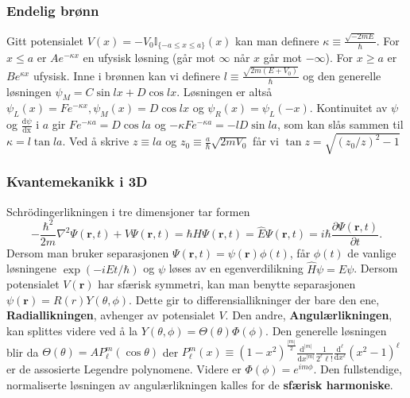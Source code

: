 \documentclass[a4paper, norsk, 8pt]{article}
\newcommand{\PAR}[2]{ \frac{\partial #1}{\partial #2}}
\begin{document}
\begin{multicols*}{3}
\subsubsection*{\scriptsize Endelig brønn}
Gitt potensialet $V(x)=-V_0\mathbb{I}_{\{-a\leq x \leq a\} }(x)$ kan man definere $\kappa\equiv\frac{\sqrt{-2mE}}{\hbar}$. For $x\leq a$ er $Ae^{-\kappa x}$ en ufysisk løsning (går mot $\infty$ når $x$ går mot $-\infty$). For $x\geq a$ er $Be^{\kappa x}$ ufysisk. Inne i brønnen kan vi definere $l\equiv \frac{\sqrt{2m(E+V_0)}}{\hbar}$ og den generelle løsningen $\psi_M = C\sin{lx}+D\cos{lx}$. Løsningen er altså $\psi_L(x) = Fe^{-\kappa x}, \psi_M(x) = D\cos{lx}$ og $\psi_R(x) = \psi_L(-x)$. Kontinuitet av $\psi$ og $\frac{\mbox{d}\psi}{\mbox{dx}}$ i $a$ gir $Fe^{-\kappa a}=D\cos{la}$ og $-\kappa Fe^{-\kappa a}=-lD\sin{la}$, som kan slås sammen til $\kappa=l\tan{la}$. Ved å skrive $z\equiv la$ og $z_0\equiv \frac{a}{\hbar}\sqrt{2mV_0}$ får vi $\tan z = \sqrt{(z_0/z)^2-1}$

\subsubsection*{\scriptsize Kvantemekanikk i 3D}
Schrödingerlikningen i tre dimensjoner tar formen \[-\frac{\hbar^2}{2m}\nabla^2\Psi(\mathbf{r},t)+V\Psi(\mathbf{r},t)=\hbar{H}\Psi(\mathbf{r},t)=\hat{E}\Psi(\mathbf{r},t)=i\hbar \PAR{\Psi(\mathbf{r},t)}{t}.\]
Dersom man bruker separasjonen $\Psi(\mathbf{r},t)=\psi(\mathbf{r})\phi(t)$, får $\phi(t)$ de vanlige løsningene $\exp{(-iEt/\hbar)}$ og $\psi$ løses av en egenverdilikning $\hat{H}\psi=E\psi$. Dersom potensialet $V(\mathbf{r})$ har sfærisk symmetri, kan man benytte separasjonen $\psi(\mathbf{r})=R(r)Y(\theta,\phi)$. Dette gir to differensiallikninger der bare den ene, \textbf{Radiallikningen}, avhenger av potensialet $V$. Den andre, \textbf{Angulærlikningen}, kan splittes videre ved å la $Y(\theta,\phi)=\Theta(\theta)\Phi(\phi)$. Den generelle løsningen blir da $\Theta(\theta)=AP_\ell^m(\cos \theta)$ der $P_\ell^m(x) \equiv (1-x^2)^{\frac{|m|}{2}}\frac{\mbox{d}^{|m|}}{\mbox{d}x^{|m|}}\frac{1}{2^\ell \ell!}\frac{\mbox{d}^{\ell}}{\mbox{d}x^{\ell}}(x^2-1)^\ell$ er de assosierte Legendre polynomene. Videre er $\Phi(\phi)=e^{im\phi}$. Den fullstendige, normaliserte løsningen av angulærlikningen kalles for de \textbf{sfærisk harmoniske}.


\end{multicols*}
\end{document}
